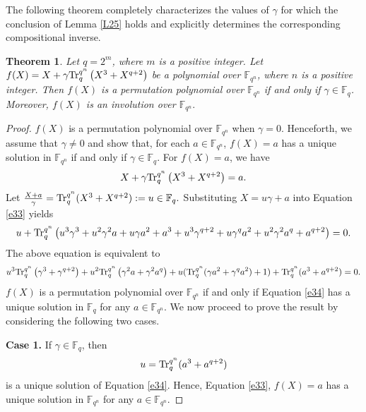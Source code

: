 \documentclass[11pt]{amsart}
\theoremstyle{plain}
\newtheorem{thm}{Theorem}[section]
\numberwithin{equation}{section}
\theoremstyle{definition}
\newcommand{\F}{\mathbb F}
\def\Tr{{\rm Tr}}
\begin{document}
The following theorem completely characterizes the values of $\gamma$
 for which the conclusion of Lemma \ref{L25} holds and explicitly determines the corresponding compositional inverse.
\begin{thm}\label{T35}
    Let $q=2^m$, where $m$ is a positive integer. Let $f(X)=X+\gamma\Tr_{q}^{q^n}\left(X^3+X^{q+2}\right)$ be a polynomial over $\F_{q^n}$, where $n$ is a positive integer. Then $f(X)$ is a permutation polynomial over $\F_{q^n}$ if and only if $\gamma \in \F_{q}$. Moreover, $f(X)$ is an involution over $\F_{q^n}.$
\end{thm}
\begin{proof}
    $f(X)$ is a permutation polynomial over $\F_{q^n}$ when $\gamma=0$. Henceforth, we assume that $\gamma \neq 0$ and show that, for each $a \in \F_{q^n}$, $f(X)=a$  has a unique solution in $\F_{q^n}$ if and only if $\gamma \in \F_{q}$. For $f(X)=a$, we have
    \begin{equation}\label{e33}
        X+\gamma\Tr_{q}^{q^n}\left(X^3+X^{q+2}\right)=a.
    \end{equation}
  Let $\frac{X+a}{\gamma}=\Tr_{q}^{q^n}(X^3+X^{q+2}) :=u\in \F_q.$ Substituting $X=u\gamma+a$ into Equation \eqref{e33} yields
    \begin{equation*}
        u+\Tr_{q}^{q^n}\left(u^3\gamma^3+u^2\gamma^2a+u\gamma a^2+a^3+u^3\gamma^{q+2}+u\gamma^qa^2+u^2\gamma^2a^q+a^{q+2}\right)=0.
    \end{equation*}
    The above equation is equivalent to 
    \begin{equation}\label{e34}
        u^3\Tr_{q}^{q^n}\left(\gamma^3+\gamma^{q+2}\right)+u^2\Tr_{q}^{q^n}\left(\gamma^2a+\gamma^2a^q\right)+u(\Tr_{q}^{q^n}(\gamma a^2+\gamma^qa^2)+1)+\Tr_{q}^{q^n}(a^3+a^{q+2})=0.
    \end{equation}
   $f(X)$ is a permutation polynomial over $\F_{q^n}$ if and only if Equation \eqref{e34} has a unique solution in $\F_q$ for any $a \in \F_{q^n}$. We now proceed to prove the result by considering the following two cases.
    
    \textbf{Case 1.} If $\gamma \in \F_q$, then $$u=\Tr_{q}^{q^n}(a^3+a^{q+2})$$ is a unique solution of Equation \eqref{e34}. Hence, Equation \eqref{e33}, $f(X)=a$ has a unique solution in $\F_{q^n}$ for any $a \in \F_{q^n}.$


\end{proof}
\end{document}
